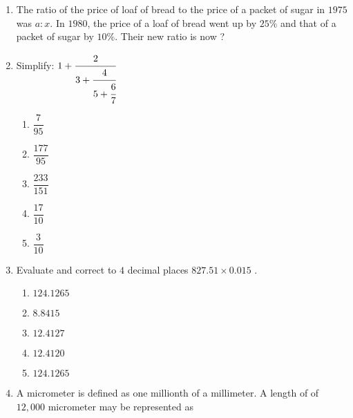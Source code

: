\begin{multicols}{2}
\begin{enumerate}[label={\arabic*.}]
\begin{enumerate}[label={\Alph*.}]
    \end{enumerate}
\item The ratio of the price of loaf of bread to the price of a packet of sugar in \(1975\) was \(a:x\). In \(1980\), the price of a loaf of bread went up by \(25\%\) and that of a packet of sugar by \(10\%\). Their new ratio is now ?
    \begin{enumerate}[label={\Alph*.}]
    \end{enumerate}
\item Simplify: \(1 + {\cfrac{2}{3 + \cfrac{4}{5+ \cfrac{6}{7}}}}\)
    \begin{enumerate}[label={\Alph*.}]
    \item \(\dfrac{7}{95}\)
    \item \(\dfrac{177}{95}\)
    \item \(\dfrac{233}{151}\)
    \item \(\dfrac{17}{10}\)
    \item \(\dfrac{3}{10}\)
    \end{enumerate}
\item Evaluate and correct to \(4\) decimal places \(827.51 \times 0.015\) .
    \begin{enumerate}[label={\Alph*.}]
    \item \(124.1265\)
    \item \(8.8415\)
    \item \(12.4127\)
    \item \(12.4120\)
    \item \(124.1265\)
    \end{enumerate}
\item A micrometer is defined as one millionth of a millimeter. A length of of \(12,000\) micrometer may be represented as

\end{enumerate}
\end{multicols}

